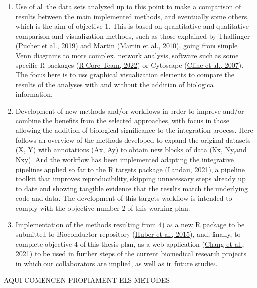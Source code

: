 \documentclass[a4paper, nobind]{templates/ociamthesis}
\begin{document}
\begin{enumerate}
\item
  Use of all the data sets analyzed up to this point to make a comparison of results between the main implemented methods, and eventually some others, which is the aim of objective 1. This is based on quantitative and qualitative comparison and visualization methods, such as those explained by Thallinger (\protect\hyperlink{ref-pucher_comparison_2019}{Pucher et al., 2019}) and Martin (\protect\hyperlink{ref-martin_bisogenet_2010}{Martin et al., 2010}), going from simple Venn diagrams to more complex, network analysis, software such as some specific R packages (\protect\hyperlink{ref-r_core_team_2022}{R Core Team, 2022}) or Cytoscape (\protect\hyperlink{ref-cline_integration_2007}{Cline et al., 2007}). The focus here is to use graphical visualization elements to compare the results of the analyses with and without the addition of biological information.
\item
  Development of new methods and/or workflows in order to improve and/or combine the benefits from the selected approaches, with focus in those allowing the addition of biological significance to the integration process. Here follows an overview of the methods developed to expand the original datasets (X, Y) with annotations (Ax, Ay) to obtain new blocks of data (Nx, Ny,and Nxy). And the workflow has been implemented adapting the integrative pipelines applied so far to the R targets package (\protect\hyperlink{ref-landau_targets_2021}{Landau, 2021}), a pipeline toolkit that improves reproducibility, skipping unnecessary steps already up to date and showing tangible evidence that the results match the underlying code and data. The development of this targets workflow is intended to comply with the objective number 2 of this working plan.
\item
  Implementation of the methods resulting from 4) as a new R package to be submitted to Bioconductor repository (\protect\hyperlink{ref-huber_orchestrating_2015}{Huber et al., 2015}), and, finally, to complete objective 4 of this thesis plan, as a web application (\protect\hyperlink{ref-shiny_2021}{Chang et al., 2021}) to be used in further steps of the current biomedical research projects in which our collaborators are implied, as well as in future studies.
\end{enumerate}

AQUI COMENCEN PROPIAMENT ELS METODES
\end{document}
